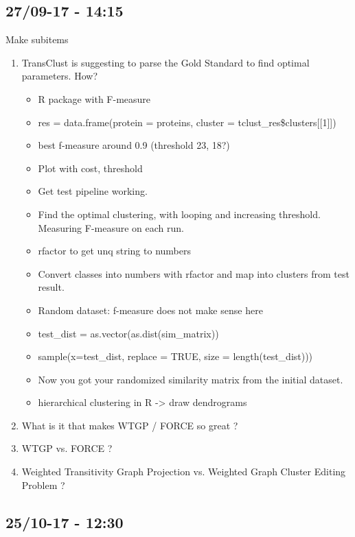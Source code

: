 \documentclass[a4paper,10pt]{article}
\begin{document}
\subsection{27/09-17 - 14:15}
Make subitems
\begin{enumerate}
	\item TransClust is suggesting to parse the Gold Standard to find optimal parameters. How?
	\begin{itemize}
		\item R package with F-measure
		\item res = data.frame(protein = proteins, cluster = tclust\_res\$clusters[[1]])
		\item best f-measure around 0.9 (threshold 23, 18?)
		\item Plot with cost, threshold
		\item Get test pipeline working.
		\item Find the optimal clustering, with looping and increasing threshold. Measuring F-measure on each run.
		\item rfactor to get unq string to numbers
		\item Convert classes into numbers with rfactor and map into clusters from test result.
		\item Random dataset: f-measure does not make sense here
		\item test\_dist = as.vector(as.dist(sim\_matrix))
		\item sample(x=test\_dist, replace = TRUE, size = length(test\_dist)))
		\item Now you got your randomized similarity matrix from the initial dataset.
		\item hierarchical clustering in R -> draw dendrograms
	\end{itemize}
	\item What is it that makes WTGP / FORCE so great ?
	\item WTGP vs. FORCE ?
	\item Weighted Transitivity Graph Projection vs. Weighted Graph Cluster Editing Problem ?
\end{enumerate}


\subsection{25/10-17 - 12:30}
\end{document}
